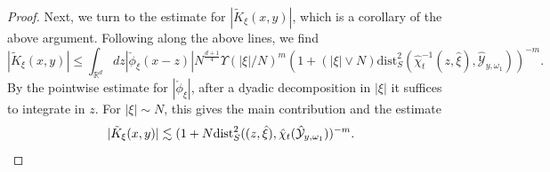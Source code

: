 \documentclass[10pt,a4paper]{amsart}
\newcommand{\R}{\mathbb{R}}
\begin{document}
\begin{proof}
Next, we turn to the estimate for $|\tilde{K}_{\xi}(x,y)|$, which is a corollary of the above argument. Following along the above lines, we find
\begin{equation*}
    |\tilde{K}_{\xi}(x,y)| \leq \int_{\R^d} dz |\check{\phi}_{\xi}(x-z)| N^{\frac{d+1}{4}} \Upsilon(|\xi|/N)^m (1+ (|\xi| \vee N) \text{dist}_S^2(\hat{\chi}_t^{-1}(z,\hat{\xi}),\hat{\mathcal{Y}}_{y,\omega_1}))^{-m}.
\end{equation*}
By the pointwise estimate for $|\check{\phi}_{\xi}|$, after a dyadic decomposition in $|\xi|$ it suffices to integrate in $z$. For $|\xi| \sim N$, this gives the main contribution and the estimate
\begin{equation*}
    |\tilde{K}_{\xi}(x,y)| \lesssim (1+ N \text{dist}_S^2((z,\hat{\xi}),\hat{\chi}_t(\hat{\mathcal{Y}}_{y,\omega_1}))^{-m}.\qedhere
\end{equation*}
\end{proof}
\end{document}
